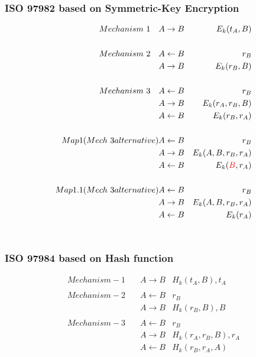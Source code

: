 \subsubsection{ISO 9798\text{-}2 based on Symmetric-Key Encryption}

\begin{eqnarray*}
    Mechanism~1 \quad & A  \rightarrow B &  E_k(t_A,B)\\
    \\
    Mechanism~2 \quad & A \leftarrow  B & r_B \\
                & A  \rightarrow B & E_k(r_B,B) \\
    \\
    Mechanism~3 \quad & A  \leftarrow B & r_B \\
                & A  \rightarrow B & E_k(r_A,r_B,B) \\
                & A  \leftarrow  B & E_k(r_B,r_A) \\
    \\
    Map1 (Mech~3 alternative) & A  \leftarrow B & r_B \\
                & A  \rightarrow B & E_k(A, B, r_B,r_A) \\
                & A  \leftarrow  B & E_k(\textcolor{red}{B},r_A) \\
    \\
    Map1.1 (Mech~3 alternative) & A  \leftarrow B & r_B \\
                & A  \rightarrow B & E_k(A, B, r_B,r_A) \\
                & A  \leftarrow  B & E_k(r_A) 
\end{eqnarray*}\\

\subsubsection{ISO 9798\text{-}4 based on Hash function}
\begin{eqnarray*}
    Mechanism-1 \quad & A \rightarrow B & H_k(t_A,B),t_A \\
    \\
    Mechanism-2 \quad & A \leftarrow B & r_B \\
                      & A \rightarrow B & H_k(r_B,B),B \\
    \\
    Mechanism-3 \quad & A \leftarrow B & r_B \\
                      & A \rightarrow B & H_k(r_A,r_B,B),r_A \\
                      & A \leftarrow B & H_k(r_B,r_A,A) 
\end{eqnarray*}

